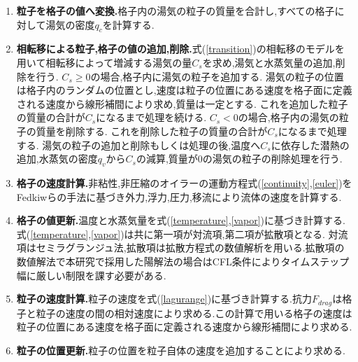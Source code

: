 \begin{enumerate}
\item {\bf 粒子を格子の値へ変換.}格子内の湯気の粒子の質量を合計し,すべての格子に対して湯気の密度$q_{c}$を計算する.
\item {\bf 相転移による粒子,格子の値の追加,削除.}式(\ref{transition})の相転移のモデルを用いて相転移によって増減する湯気の量$C_{s}$を求め,湯気と水蒸気量の追加,削除を行う.
$C_{s} \geq 0$の場合,格子内に湯気の粒子を追加する.
湯気の粒子の位置は格子内のランダムの位置とし,速度は粒子の位置にある速度を格子面に定義される速度から線形補間により求め,質量は一定とする.
これを追加した粒子の質量の合計が$C_{s}$になるまで処理を続ける.
$C_{s} < 0$の場合,格子内の湯気の粒子の質量を削除する.
これを削除した粒子の質量の合計が$C_{s}$になるまで処理する.
湯気の粒子の追加と削除もしくは処理の後,温度へ$C_{s}$に依存した潜熱の追加,水蒸気の密度$q_{v}$から$C_{s}$の減算,質量が0の湯気の粒子の削除処理を行う.
\item {\bf 格子の速度計算.}非粘性,非圧縮のオイラーの運動方程式(\ref{continuity},\ref{euler})をFedkiwら\cite{Fedkiw2001}の手法に基づき外力,浮力,圧力,移流により流体の速度を計算する.
\item {\bf 格子の値更新.}温度と水蒸気量を式(\ref{temperature},\ref{vapor})に基づき計算する.式(\ref{temperature},\ref{vapor})は共に第一項が対流項,第二項が拡散項となる.
対流項はセミラグランジュ法,拡散項は拡散方程式の数値解析を用いる.拡散項の数値解法で本研究で採用した陽解法の場合はCFL条件によりタイムステップ幅に厳しい制限を課す必要がある.
\item {\bf 粒子の速度計算.}粒子の速度を式(\ref{lagurange})に基づき計算する.抗力$F_{drag}$は格子と粒子の速度の間の相対速度により求める.この計算で用いる格子の速度は粒子の位置にある速度を格子面に定義される速度から線形補間により求める.
\item {\bf 粒子の位置更新.}粒子の位置を粒子自体の速度を追加することにより求める.
\end{enumerate}

